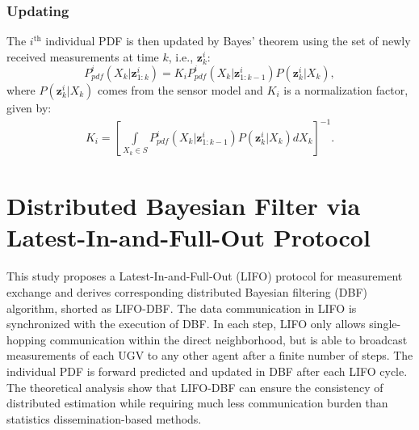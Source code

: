 \documentclass[journal]{IEEEtranTIE}
\theoremstyle{remark}
\newcommand{\X}{X}
\begin{document}
	\subsubsection{Updating}
	The $i^\text{th}$ individual PDF is then updated by Bayes' theorem using the set of newly received measurements at time $k$, i.e., $\mathbf{z}^i_k$:
	\small\begin{equation}\label{eqn:bayes_upd}
		P^i_{pdf}(\X_k|\mathbf{z}^i_{1:k})
		=K_iP^i_{pdf}(\X_k|\mathbf{z}^i_{1:k-1})P(\mathbf{z}^i_k|\X_k),
	\end{equation}\normalsize
	where $P(\mathbf{z}^i_k|\X_k)$ comes from the sensor model and $K_i$ is a normalization factor, given by:
	\small\begin{align*}
		K_i=\left[\int\limits_{\X_k\in S} P^i_{pdf}(\X_k|\mathbf{z}^i_{1:k-1})P(\mathbf{z}^i_k|\X_k)d\X_k\right]^{-1}.
	\end{align*}\normalsize
	
	\section{Distributed Bayesian Filter via Latest-In-and-Full-Out Protocol}\label{sec:LIFO-dbf}
	This study proposes a Latest-In-and-Full-Out (LIFO) protocol for measurement exchange and derives corresponding distributed Bayesian filtering (DBF) algorithm, shorted as LIFO-DBF. 
	The data communication in LIFO is synchronized with the execution of DBF.
	In each step, LIFO only allows single-hopping communication within the direct neighborhood, but is able to broadcast measurements of each UGV to any other agent after a finite number of steps.
	The individual PDF is forward predicted and updated in DBF after each LIFO cycle.
	The theoretical analysis show that LIFO-DBF can ensure the consistency of distributed estimation while requiring much less communication burden than statistics dissemination-based methods.
	
	
\end{document}
